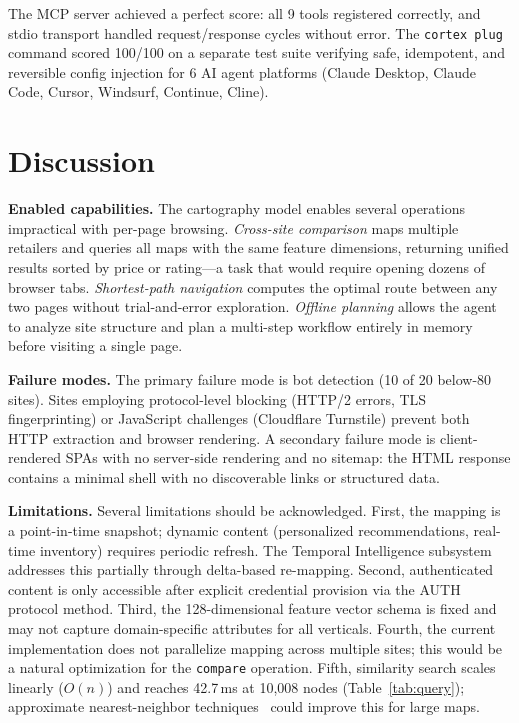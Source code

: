 \documentclass[10pt, twocolumn]{article}
\begin{document}
The MCP server achieved a perfect score: all 9 tools registered correctly, and stdio transport handled request/response cycles without error. The \texttt{cortex plug} command scored 100/100 on a separate test suite verifying safe, idempotent, and reversible config injection for 6 AI agent platforms (Claude Desktop, Claude Code, Cursor, Windsurf, Continue, Cline).


\section{Discussion}
\label{sec:discussion}

\textbf{Enabled capabilities.} The cartography model enables several operations impractical with per-page browsing. \emph{Cross-site comparison} maps multiple retailers and queries all maps with the same feature dimensions, returning unified results sorted by price or rating---a task that would require opening dozens of browser tabs. \emph{Shortest-path navigation} computes the optimal route between any two pages without trial-and-error exploration. \emph{Offline planning} allows the agent to analyze site structure and plan a multi-step workflow entirely in memory before visiting a single page.

\textbf{Failure modes.} The primary failure mode is bot detection (10 of 20 below-80 sites). Sites employing protocol-level blocking (HTTP/2 errors, TLS fingerprinting) or JavaScript challenges (Cloudflare Turnstile) prevent both HTTP extraction and browser rendering. A secondary failure mode is client-rendered SPAs with no server-side rendering and no sitemap: the HTML response contains a minimal shell with no discoverable links or structured data.

\textbf{Limitations.} Several limitations should be acknowledged. First, the mapping is a point-in-time snapshot; dynamic content (personalized recommendations, real-time inventory) requires periodic refresh. The Temporal Intelligence subsystem addresses this partially through delta-based re-mapping. Second, authenticated content is only accessible after explicit credential provision via the AUTH protocol method. Third, the 128-dimensional feature vector schema is fixed and may not capture domain-specific attributes for all verticals. Fourth, the current implementation does not parallelize mapping across multiple sites; this would be a natural optimization for the \texttt{compare} operation. Fifth, similarity search scales linearly ($O(n)$) and reaches 42.7\,ms at 10{,}008 nodes (Table~\ref{tab:query}); approximate nearest-neighbor techniques~\cite{johnson2019faiss} could improve this for large maps.
\end{document}
